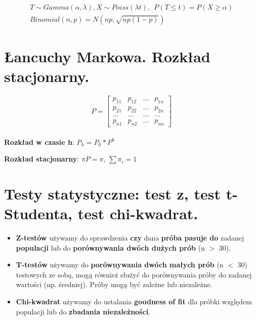 \documentclass[main.tex]{subfiles}
\begin{document}
    \begin{gather*}
        T \sim Gamma(\alpha, \lambda), X \sim Poiss(\lambda t), ~~ P(T \leq t) = P( X \geq \alpha) \\
        Binomial(n, p) = N(np, \sqrt{np(1-p)})
    \end{gather*}


    \section{Łancuchy Markowa. Rozkład stacjonarny.}

    \begin{equation*}
        P =
        \begin{bmatrix}
            p_{1 1} & p_{1 2} & \dots & p_{1 n}\\
            p_{2 1} & p_{2 2} & \dots & p_{2 n}\\
            \dots & \dots & \dots & \dots\\
            p_{n 1} & p_{n 2} & \dots & p_{n n}
        \end{bmatrix}
    \end{equation*}
    \hfill \\

    \textbf{Rozkład w czasie h}: $P_h = P_0 * P^h$

    \textbf{Rozkład stacjonarny}: $\pi P = \pi$, $\sum \pi_i = 1$


    \section{Testy statystyczne: test z, test t-Studenta, test chi-kwadrat.}

    \begin{itemize}
        \item \textbf{Z-testów} używamy do sprawdzenia \textbf{czy} dana \textbf{próba pasuje do} zadanej
        \textbf{populacji} lub do  \textbf{porównywania dwóch dużych prób} (n $>$ 30).
        \item \textbf{T-testów} używamy do \textbf{porównywania dwóch małych prób} (n $<$ 30) testowych ze sobą,
        mogą również służyć do porównywania próby do zadanej wartości (np. średniej).
        Próby mogą być zależne lub niezależne.
        \item \textbf{Chi-kwadrat} używamy do ustalania \textbf{goodness of fit} dla próbki względem populacji lub do
        \textbf{zbadania niezależności}.
    \end{itemize}
\end{document}
